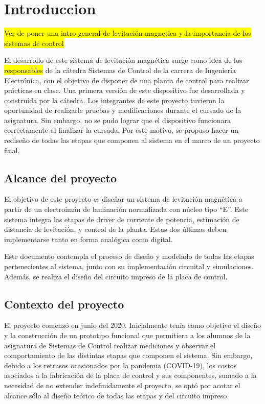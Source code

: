 \chapter{Introduccion}  \label{cap:Introducción}


\noindent \colorbox{yellow}{Ver de poner una intro general de levitación magnetica y la importancia de los sistemas de control}

\noindent El desarrollo de este sistema de levitación magnética surge como idea de los \colorbox{yellow}{responsables} de la cátedra Sistemas de Control de la carrera de Ingeniería Electrónica, con el objetivo de disponer de una planta de control para realizar prácticas en clase. Una primera versión de este dispositivo fue desarrollada y construída por la cátedra. Los integrantes de este proyecto tuvieron la oportunidad de realizarle pruebas y modificaciones durante el cursado de la asignatura. Sin embargo, no se pudo lograr que el dispositivo funcionara correctamente al finalizar la cursada. Por este motivo, se propuso hacer un rediseño de todas las etapas que componen al sistema en el marco de un proyecto final.



\section{Alcance del proyecto}

\noindent El objetivo de este proyecto es diseñar un sistema de levitación magnética a partir de un electroimán de laminación normalizada con núcleo tipo “E''. Este sistema integra las etapas de driver de corriente de potencia, estimación de distancia de levitación, y control de la planta. Estas dos últimas deben implementarse tanto en forma analógica como digital.

\noindent Este documento contempla el proceso de diseño y modelado de todas las etapas pertenecientes al sistema, junto con su implementación circuital y simulaciones. Además, se realiza el diseño del circuito impreso de la placa de control.



\section{Contexto del proyecto}

\noindent El proyecto comenzó en junio del 2020. Inicialmente tenía como objetivo el diseño y la construcción de un prototipo funcional que permitiera a los alumnos de la asignatura de Sistemas de Control realizar mediciones y observar el comportamiento de las distintas etapas que componen el sistema. Sin embargo, debido a los retrasos ocasionados por la pandemia (COVID-19), los costos asociados a la fabricación de la placa de control y sus componentes, sumado a la  necesidad de no extender indefinidamente el proyecto, se optó por acotar el alcance sólo al diseño teórico de todas las etapas y del circuito impreso.

